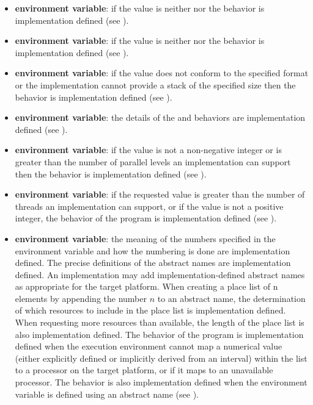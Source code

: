 \begin{itemize}
\item {} \textbf{environment variable}: if the value is neither 
 nor  the behavior is implementation defined (see 
).

\item {} \textbf{environment variable}: if the value is neither 
 nor  the behavior is implementation defined (see 
).

\item {} \textbf{environment variable}: if the value does not conform to the 
specified format or the implementation cannot provide a stack of the specified size 
then the behavior is implementation defined (see ).

\item {} \textbf{environment variable}: the details of the  and 
 behaviors are implementation defined (see ).

\item {} \textbf{environment variable}: if the value is not a 
non-negative integer or is greater than the number of parallel levels an implementation 
can support then the behavior is implementation defined (see ).

\item {} \textbf{environment variable}: if the requested value is greater than 
the number of threads an implementation can support, or if the value is not a positive 
integer, the behavior of the program is implementation defined (see ).

\item {} \textbf{environment variable}: the meaning of the numbers specified in the 
environment variable and how the numbering is done are implementation defined. 
The precise definitions of the abstract names are implementation defined. An
implementation may add implementation-defined abstract names as appropriate for 
the target platform. When creating a place list of n elements by appending the 
number $n$ to an abstract name, the determination of which resources to include in the 
place list is implementation defined. When requesting more resources than available, 
the length of the place list is also implementation defined. The behavior of the 
program is implementation defined when the execution environment cannot map a 
numerical value (either explicitly defined or implicitly derived from an interval) 
within the  list to a processor on the target platform, or if it maps to an 
unavailable processor. The behavior is also implementation defined when the 
 environment variable is defined using an abstract name (see ).


\end{itemize}
